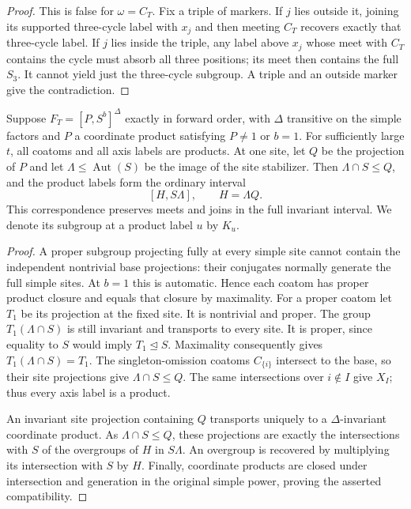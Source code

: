 \begin{proof}
This is false for $\omega=C_T$.  Fix a triple of markers.  If $j$
lies outside it, joining its supported three-cycle label with $x_j$
and then meeting $C_T$ recovers exactly that three-cycle label.
If $j$ lies inside the triple, any label above $x_j$ whose meet with
$C_T$ contains the cycle must absorb all three positions; its meet
then contains the full $S_3$.  It cannot yield just the three-cycle
subgroup.  A triple and an outside marker give the contradiction.
\end{proof}

\begin{lemma}
\label{r:marker-site}
Suppose $F_T=[P,S^b]^\Delta$ exactly in forward order, with
$\Delta$ transitive on the simple factors and $P$ a coordinate
product satisfying $P\ne1$ or $b=1$.  For sufficiently large $t$,
all coatoms and all axis labels are products.  At one site, let
$Q$ be the projection of $P$ and let
$\Lambda\le\operatorname{Aut}(S)$ be the image of the site
stabilizer.  Then $\Lambda\cap S\le Q$, and the product labels
form the ordinary interval
\[
 [H,S\Lambda],\qquad H=\Lambda Q.
\]
This correspondence preserves meets and joins in the full invariant
interval.  We denote its subgroup at a product label $u$ by $K_u$.
\end{lemma}

\begin{proof}
A proper subgroup projecting fully at every simple site cannot
contain the independent nontrivial base projections: their
conjugates normally generate the full simple sites.  At $b=1$
this is automatic.  Hence each coatom has proper product closure
and equals that closure by maximality.
For a proper coatom let $T_1$ be its projection at the fixed site.
It is nontrivial and proper.  The group
$T_1(\Lambda\cap S)$ is still invariant and transports to every
site.  It is proper, since equality to $S$ would imply
$T_1\trianglelefteq S$.  Maximality consequently gives
$T_1(\Lambda\cap S)=T_1$.
The singleton-omission coatoms $C_{\{i\}}$ intersect to the base,
so their site projections give $\Lambda\cap S\le Q$.
The same intersections over $i\notin I$ give $X_I$; thus every
axis label is a product.

An invariant site projection containing $Q$ transports uniquely
to a $\Delta$-invariant coordinate product.  As
$\Lambda\cap S\le Q$, these projections are exactly the
intersections with $S$ of the overgroups of $H$ in $S\Lambda$.
An overgroup is recovered by multiplying its intersection with
$S$ by $H$.  Finally, coordinate products are closed under
intersection and generation in the original simple power,
proving the asserted compatibility.
\end{proof}

